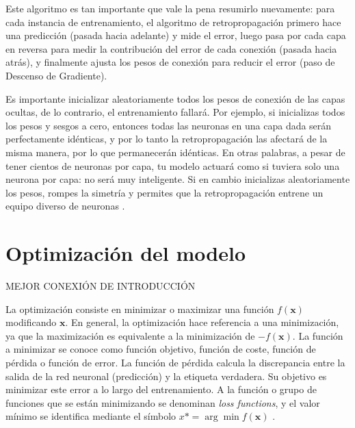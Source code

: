 Este algoritmo es tan importante que vale la pena resumirlo nuevamente: para cada instancia de entrenamiento, el algoritmo de retropropagación primero hace una predicción (pasada hacia adelante) y mide el error, luego pasa por cada capa en reversa para medir la contribución del error de cada conexión (pasada hacia atrás), y finalmente ajusta los pesos de conexión para reducir el error (paso de Descenso de Gradiente).

Es importante inicializar aleatoriamente todos los pesos de conexión de las capas ocultas, de lo contrario, el entrenamiento fallará. Por ejemplo, si inicializas todos los pesos y sesgos a cero, entonces todas las neuronas en una capa dada serán perfectamente idénticas, y por lo tanto la retropropagación las afectará de la misma manera, por lo que permanecerán idénticas. En otras palabras, a pesar de tener cientos de neuronas por capa, tu modelo actuará como si tuviera solo una neurona por capa: no será muy inteligente. Si en cambio inicializas aleatoriamente los pesos, rompes la simetría y permites que la retropropagación entrene un equipo diverso de neuronas \citep{geron2022hands}.



\section{Optimización del modelo} MEJOR CONEXIÓN DE INTRODUCCIÓN

La optimización consiste en minimizar o maximizar una función $f(\mathbf{x})$ modificando $\mathbf{x}$. En general, la optimización hace referencia a una minimización, ya que la maximización es equivalente a la minimización de $-f(\mathbf{x})$. La función a minimizar se conoce como función objetivo, función de coste, función de pérdida o función de error. La función de pérdida calcula la discrepancia entre la salida de la red neuronal (predicción) y la etiqueta verdadera. Su objetivo es minimizar este error a lo largo del entrenamiento. A la función o grupo de funciones que se están minimizando se denominan \textit{loss functions}, y el valor mínimo se identifica mediante el símbolo $x* = \arg \min f(\mathbf{x})$ \citep{pajares2021aprendizaje}. 

